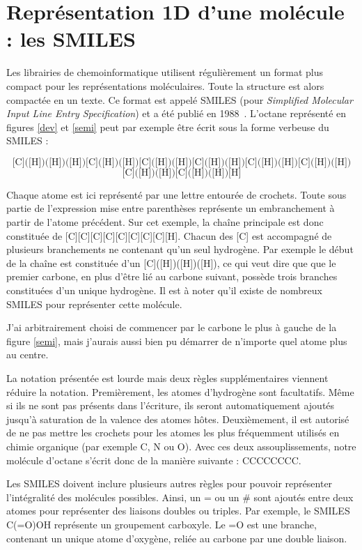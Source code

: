\section{Représentation 1D d'une molécule : les SMILES}

Les librairies de chemoinformatique utilisent régulièrement un format plus compact pour les représentations moléculaires.
Toute la structure est alors compactée en un texte.
Ce format est appelé SMILES (pour \textit{Simplified Molecular Input Line Entry Specification}) et a été publié en 1988~\cite{weininger_smiles_1988}.
L'octane représenté en figures \ref{dev} et \ref{semi} peut par exemple être écrit sous la forme verbeuse du SMILES :

\[\text{[C]([H])([H])([H])[C]([H])([H])[C]([H])([H])[C]([H])([H])[C]([H])([H])[C]([H])([H])}\]
\[\text{[C]([H])([H])[C]([H])([H])[H]}\]

Chaque atome est ici représenté par une lettre entourée de crochets.
Toute sous partie de l'expression mise entre parenthèses représente un embranchement à partir de l'atome précédent.
Sur cet exemple, la chaîne principale est donc constituée de [C][C][C][C][C][C][C][C][H].
Chacun des [C] est accompagné de plusieurs branchements ne contenant qu'un seul hydrogène.
Par exemple le début de la chaîne est constituée d'un [C]([H])([H])([H]), ce qui veut dire que que le premier carbone, en plus d'être lié au carbone suivant, possède trois branches constituées d'un unique hydrogène.
Il est à noter qu'il existe de nombreux SMILES pour représenter cette molécule.

J'ai arbitrairement choisi de commencer par le carbone le plus à gauche de la figure \ref{semi}, mais j'aurais aussi bien pu démarrer de n'importe quel atome plus au centre.

La notation présentée est lourde mais deux règles supplémentaires viennent réduire la notation.
Premièrement, les atomes d'hydrogène sont facultatifs.
Même si ils ne sont pas présents dans l'écriture, ils seront automatiquement ajoutés jusqu'à saturation de la valence des atomes hôtes.
Deuxièmement, il est autorisé de ne pas mettre les crochets pour les atomes les plus fréquemment utilisés en chimie organique (par exemple C, N ou O).
Avec ces deux assouplissements, notre molécule d'octane s'écrit donc de la manière suivante : CCCCCCCC.

Les SMILES doivent inclure plusieurs autres règles pour pouvoir représenter l'intégralité des molécules possibles.
Ainsi, un = ou un \# sont ajoutés entre deux atomes pour représenter des liaisons doubles ou triples.
Par exemple, le SMILES C(=O)OH représente un groupement carboxyle.
Le =O est une branche, contenant un unique atome d'oxygène, reliée au carbone par une double liaison.

